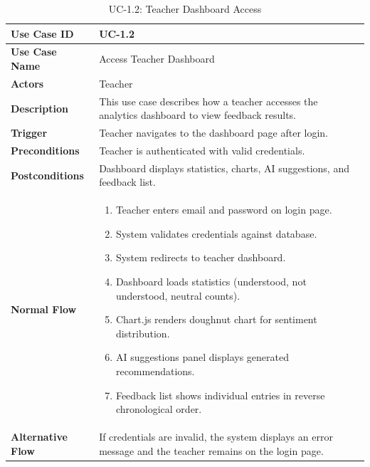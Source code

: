 \begin{table}[H]
\centering
\caption{UC-1.2: Teacher Dashboard Access}

\begin{tabularx}{\textwidth}{
|>{\raggedright\arraybackslash}p{3.5cm}
|>{\raggedright\arraybackslash}X|}

\hline
\textbf{Use Case ID} & UC-1.2 \\ \hline
\textbf{Use Case Name} & Access Teacher Dashboard \\ \hline
\textbf{Actors} & Teacher \\ \hline
\textbf{Description} & This use case describes how a teacher accesses the analytics dashboard to view feedback results. \\ \hline
\textbf{Trigger} & Teacher navigates to the dashboard page after login. \\ \hline
\textbf{Preconditions} & Teacher is authenticated with valid credentials. \\ \hline
\textbf{Postconditions} & Dashboard displays statistics, charts, AI suggestions, and feedback list. \\ \hline
\textbf{Normal Flow} &
\begin{enumerate}
    \item Teacher enters email and password on login page.
    \item System validates credentials against database.
    \item System redirects to teacher dashboard.
    \item Dashboard loads statistics (understood, not understood, neutral counts).
    \item Chart.js renders doughnut chart for sentiment distribution.
    \item AI suggestions panel displays generated recommendations.
    \item Feedback list shows individual entries in reverse chronological order.
\end{enumerate}
\\ \hline
\textbf{Alternative Flow} &
If credentials are invalid, the system displays an error message and the teacher remains on the login page.
\\ \hline

\end{tabularx}

\end{table}


